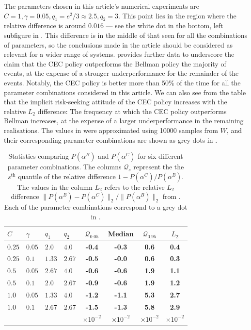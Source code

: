 \documentclass[main.tex]{subfiles}
\begin{document}
The parameters chosen in this article's numerical experiments
are $C=1,\gamma=0.05,q_1=e^2/3\approx2.5,q_2=3$. This point lies
in the region where the relative difference is around $0.016$ --- see the
white dot in the
bottom, left subfigure in .
This difference is in the middle of that seen for all the
combinations of parameters, so the conclusions made in the article
should be considered as relevant for a wider range of systems.
 provides further data to underscore
the claim that the CEC policy
outperforms the Bellman policy the
majority of events, at the expense of a stronger underperformance
for the remainder of the events. Notably, the CEC policy is better
more than 50\% of the time for all the parameter
combinations considered in this article.
We can also see from the table that the implicit risk-seeking attitude
of the CEC policy increases with
the relative $L_2$ difference: The frequency at which the CEC policy
outperforms Bellman increases, at the expense of a larger
underperformance in the remaining realisations.
The values in  were approximated using \num{10000} samples
from $W$, and their corresponding parameter combinations are shown as
grey dots in .

\begin{table}[htbp]
  \centering
  \begin{tabular}{llllcccc}
    $C$ & $\gamma$ & $q_1$ & $q_2$ & $\mathcal Q_{0.05}$
    &Median & $\mathcal Q_{0.95}$ &$L_2$\\
    \toprule
    $0.25$ & $0.05$ & $2.0$ & $4.0$  & \textbf{-0.4} & \textbf{-0.3} & \textbf{0.6} & \textbf{0.4}\\
    $0.25$ & $0.1$ & $1.33$ & $2.67$ & \textbf{-0.5} & \textbf{-0.0} & \textbf{0.6} & \textbf{0.3}\\
    $0.5$ & $0.05$ & $2.67$ & $4.0$  & \textbf{-0.6} & \textbf{-0.6} & \textbf{1.9} & \textbf{1.1}\\
    $0.5$ & $0.1$ & $2.0$ & $2.67$   & \textbf{-0.9} & \textbf{-0.6} & \textbf{1.9} & \textbf{1.2}\\
    $1.0$ & $0.05$ & $1.33$ & $4.0$  & \textbf{-1.2} & \textbf{-1.1} & \textbf{5.3} & \textbf{2.7}\\
    $1.0$ & $0.1$ & $2.67$ & $2.67$  & \textbf{-1.5} & \textbf{-1.3} & \textbf{5.8} & \textbf{2.9}\\
    &&&&$\times 10^{-2}$&$\times 10^{-2}$&$\times 10^{-2}$&$\times 10^{-2}$\\
    \bottomrule
  \end{tabular}
  \caption{Statistics comparing $P(\alpha^B)$ and $P(\alpha^C)$ for six different
    parameter combinations. The columns $\mathcal Q_s$ represent the
    the $s^{\text{th}}$ quantile of the relative
    difference
    $1-P(\alpha^C)/P(\alpha^B)$. %
    The values in the column $L_2$ refers to the relative $L_2$
    difference $\|P(\alpha^B)-P(\alpha^C)\|_2/\|P(\alpha^B)\|_2$
    from . Each of the parameter
    combinations correspond to a grey dot in .
  }\label{tbl:paramcomparisons}
\end{table}
\biblio
\end{document}
